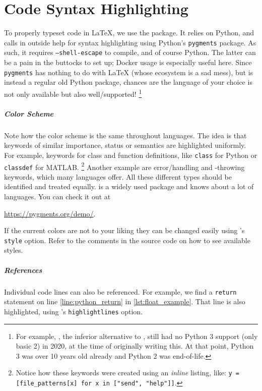 \chapter{Code Syntax Highlighting}
\label{ch:code-listings}

To properly typeset code in \LaTeX{}, we use the  package.
It relies on Python, and calls in outside help for syntax highlighting using Python's
\texttt{pygments} package.
As such, it requires \texttt{--shell-escape} to compile, and of course Python.
The latter can be a pain in the buttocks to set up; Docker usage is especially useful here.
Since \texttt{pygments} has nothing to do with \LaTeX{} (whose ecosystem is a sad mess),
but is instead a regular old Python package, chances are the language of your choice is
not only available but also well\-/supported!%
\footnote{%
    For example, , the inferior alternative to ,
    still had no Python 3 support (only basic 2) in 2020, at the time of originally writing this.
    At that point, Python 3 was over 10 years old already and Python 2 was end-of-life.
}

\paragraph{Color Scheme}
Note how the color scheme is the same throughout languages.
The idea is that keywords of similar importance, status or semantics are highlighted uniformly.
For example, keywords for class and function definitions, like \texttt{class}
for Python or \texttt{classdef} for MATLAB.%
\footnote{%
Notice how these keywords were created using an \emph{inline} listing, like:
\texttt{y = [file_patterns[x] for x in ["send", "help"]]}.
}
Another example are error\-/handling and -throwing keywords, which many languages
offer.
All these different types should be identified and treated equally.
 is a widely used package and knows about a lot of languages.
You can check it out at
\begin{center}
    \url{https://pygments.org/demo/}.
\end{center}

If the current colors are not to your liking they can be changed easily using
's \texttt{style} option.
Refer to the comments in the source code on how to see available styles.

\paragraph{References}
Individual code lines can also be referenced.
For example, we find a \texttt{return} statement on
line \ref{line:python_return} in \cref{lst:float_example}.
That line is also highlighted, using 's \texttt{highlightlines} option.

